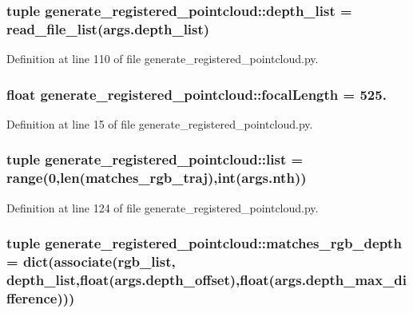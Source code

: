 \subsubsection[{depth\-\_\-list}]{\setlength{\rightskip}{0pt plus 5cm}tuple {\bf generate\-\_\-registered\-\_\-pointcloud\-::depth\-\_\-list} = read\-\_\-file\-\_\-list(args.\-depth\-\_\-list)}\label{namespacegenerate__registered__pointcloud_a00d88c643746d0192f48fcbae6d7ba8f}


\-Definition at line 110 of file generate\-\_\-registered\-\_\-pointcloud.\-py.

\subsubsection[{focal\-Length}]{\setlength{\rightskip}{0pt plus 5cm}float {\bf generate\-\_\-registered\-\_\-pointcloud\-::focal\-Length} = 525.}\label{namespacegenerate__registered__pointcloud_a403a272b827b04ae2a43d3d08fa4200f}


\-Definition at line 15 of file generate\-\_\-registered\-\_\-pointcloud.\-py.

\subsubsection[{list}]{\setlength{\rightskip}{0pt plus 5cm}tuple {\bf generate\-\_\-registered\-\_\-pointcloud\-::list} = range(0,len({\bf matches\-\_\-rgb\-\_\-traj}),int(args.\-nth))}\label{namespacegenerate__registered__pointcloud_accd6c148b0a675d04fa99106c1b74e57}


\-Definition at line 124 of file generate\-\_\-registered\-\_\-pointcloud.\-py.

\subsubsection[{matches\-\_\-rgb\-\_\-depth}]{\setlength{\rightskip}{0pt plus 5cm}tuple {\bf generate\-\_\-registered\-\_\-pointcloud\-::matches\-\_\-rgb\-\_\-depth} = dict(associate({\bf rgb\-\_\-list}, {\bf depth\-\_\-list},float(args.\-depth\-\_\-offset),float(args.\-depth\-\_\-max\-\_\-difference)))}\label{namespacegenerate__registered__pointcloud_acb7d89862548d18a37d91cab69d49b78}


